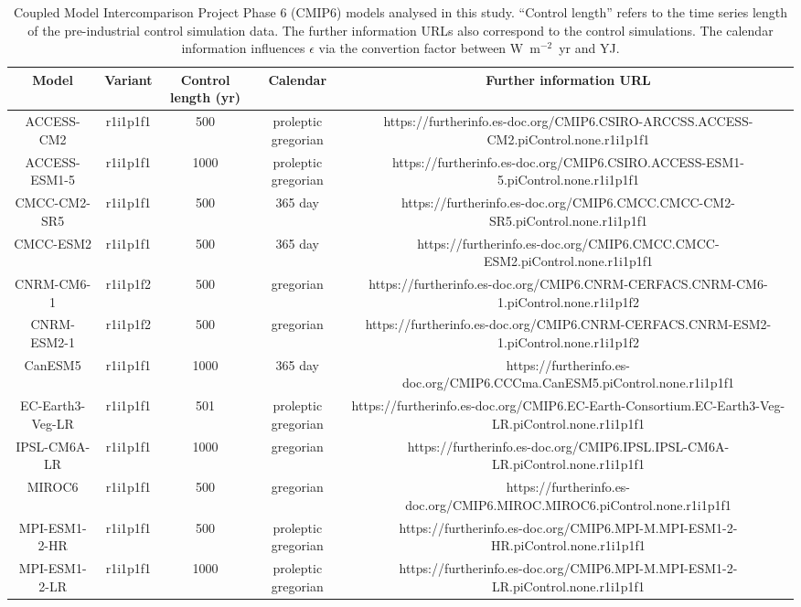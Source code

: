 \begin{table*}[t]
\centering
\caption{Coupled Model Intercomparison Project Phase 6 (CMIP6) models analysed in this study. ``Control length'' refers to the time series length of the pre-industrial control simulation data. The further information URLs also correspond to the control simulations. The calendar information influences $\epsilon$ via the convertion factor between W~m$^{-2}$~yr and YJ.}
\begin{tabular}{ccccc}
\toprule
Model & Variant & Control length (yr) & Calendar & Further information URL \\
\midrule
ACCESS-CM2 & r1i1p1f1 & 500 & proleptic gregorian & https://furtherinfo.es-doc.org/CMIP6.CSIRO-ARCCSS.ACCESS-CM2.piControl.none.r1i1p1f1 \\
ACCESS-ESM1-5 & r1i1p1f1 & 1000 & proleptic gregorian & https://furtherinfo.es-doc.org/CMIP6.CSIRO.ACCESS-ESM1-5.piControl.none.r1i1p1f1 \\
CMCC-CM2-SR5 & r1i1p1f1 & 500 & 365 day & https://furtherinfo.es-doc.org/CMIP6.CMCC.CMCC-CM2-SR5.piControl.none.r1i1p1f1 \\
CMCC-ESM2 & r1i1p1f1 & 500 & 365 day & https://furtherinfo.es-doc.org/CMIP6.CMCC.CMCC-ESM2.piControl.none.r1i1p1f1 \\
CNRM-CM6-1 & r1i1p1f2 & 500 & gregorian & https://furtherinfo.es-doc.org/CMIP6.CNRM-CERFACS.CNRM-CM6-1.piControl.none.r1i1p1f2 \\
CNRM-ESM2-1 & r1i1p1f2 & 500 & gregorian & https://furtherinfo.es-doc.org/CMIP6.CNRM-CERFACS.CNRM-ESM2-1.piControl.none.r1i1p1f2 \\
CanESM5 & r1i1p1f1 & 1000 & 365 day & https://furtherinfo.es-doc.org/CMIP6.CCCma.CanESM5.piControl.none.r1i1p1f1 \\
EC-Earth3-Veg-LR & r1i1p1f1 & 501 & proleptic gregorian & https://furtherinfo.es-doc.org/CMIP6.EC-Earth-Consortium.EC-Earth3-Veg-LR.piControl.none.r1i1p1f1 \\
IPSL-CM6A-LR & r1i1p1f1 & 1000 & gregorian & https://furtherinfo.es-doc.org/CMIP6.IPSL.IPSL-CM6A-LR.piControl.none.r1i1p1f1 \\
MIROC6 & r1i1p1f1 & 500 & gregorian & https://furtherinfo.es-doc.org/CMIP6.MIROC.MIROC6.piControl.none.r1i1p1f1 \\
MPI-ESM1-2-HR & r1i1p1f1 & 500 & proleptic gregorian & https://furtherinfo.es-doc.org/CMIP6.MPI-M.MPI-ESM1-2-HR.piControl.none.r1i1p1f1 \\
MPI-ESM1-2-LR & r1i1p1f1 & 1000 & proleptic gregorian & https://furtherinfo.es-doc.org/CMIP6.MPI-M.MPI-ESM1-2-LR.piControl.none.r1i1p1f1 \\

\end{tabular}
\end{table*}
